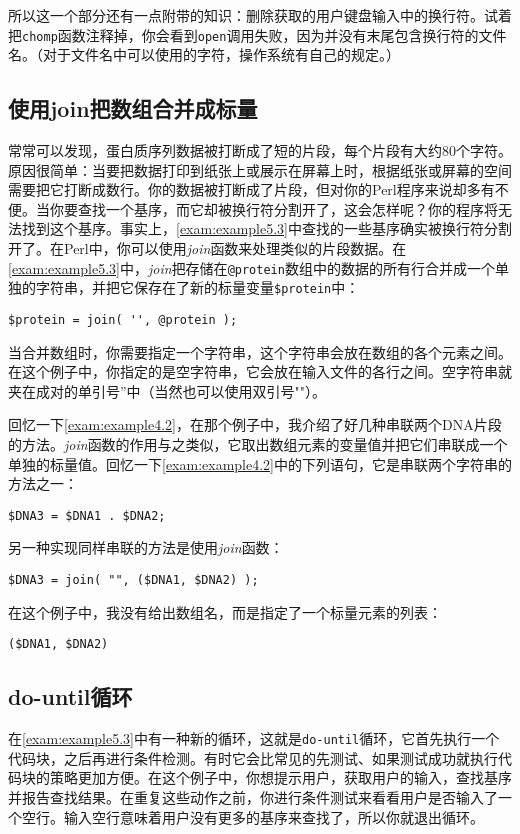 所以这一个部分还有一点附带的知识：删除获取的用户键盘输入中的换行符。试着把\verb|chomp|函数注释掉，你会看到\verb|open|调用失败，因为并没有末尾包含换行符的文件名。（对于文件名中可以使用的字符，操作系统有自己的规定。）

\subsection{使用join把数组合并成标量}
\label{sect:section5.3.2}
常常可以发现，蛋白质序列数据被打断成了短的片段，每个片段有大约80个字符。原因很简单：当要把数据打印到纸张上或展示在屏幕上时，根据纸张或屏幕的空间需要把它打断成数行。你的数据被打断成了片段，但对你的Perl程序来说却多有不便。当你要查找一个基序，而它却被换行符分割开了，这会怎样呢？你的程序将无法找到这个基序。事实上，\autoref{exam:example5.3}中查找的一些基序确实被换行符分割开了。在Perl中，你可以使用\textit{join}函数来处理类似的片段数据。在\autoref{exam:example5.3}中，\textit{join}把存储在\verb|@protein|数组中的数据的所有行合并成一个单独的字符串，并把它保存在了新的标量变量\verb|$protein|中：

\begin{lstlisting}
$protein = join( '', @protein );
\end{lstlisting}

当合并数组时，你需要指定一个字符串，这个字符串会放在数组的各个元素之间。在这个例子中，你指定的是空字符串，它会放在输入文件的各行之间。空字符串就夹在成对的单引号''中（当然也可以使用双引号""）。


回忆一下\autoref{exam:example4.2}，在那个例子中，我介绍了好几种串联两个DNA片段的方法。\textit{join}函数的作用与之类似，它取出数组元素的变量值并把它们串联成一个单独的标量值。回忆一下\autoref{exam:example4.2}中的下列语句，它是串联两个字符串的方法之一：

\begin{lstlisting}
$DNA3 = $DNA1 . $DNA2;
\end{lstlisting}

另一种实现同样串联的方法是使用\textit{join}函数：

\begin{lstlisting}
$DNA3 = join( "", ($DNA1, $DNA2) );
\end{lstlisting}

在这个例子中，我没有给出数组名，而是指定了一个标量元素的列表：

\begin{lstlisting}
($DNA1, $DNA2)
\end{lstlisting}

\subsection{do-until循环}
在\autoref{exam:example5.3}中有一种新的循环，这就是\verb|do-until|循环，它首先执行一个代码块，之后再进行条件检测。有时它会比常见的先测试、如果测试成功就执行代码块的策略更加方便。在这个例子中，你想提示用户，获取用户的输入，查找基序并报告查找结果。在重复这些动作之前，你进行条件测试来看看用户是否输入了一个空行。输入空行意味着用户没有更多的基序来查找了，所以你就退出循环。

